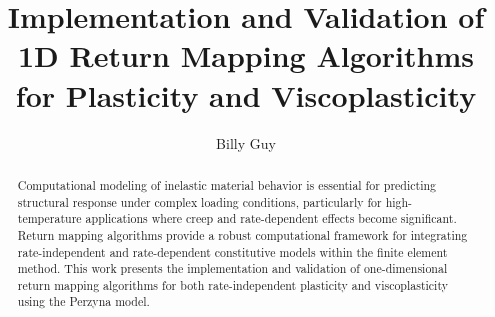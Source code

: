\documentclass[final,5p,times,twocolumn]{elsarticle}
\begin{document}
\begin{frontmatter}



\title{Implementation and Validation of 1D Return Mapping 
Algorithms for Plasticity and Viscoplasticity}


\author{Billy Guy} %


\begin{abstract}

Computational modeling of inelastic material behavior is essential for 
predicting structural response under complex loading conditions, particularly for high-temperature applications where creep and rate-dependent effects become significant. Return mapping algorithms provide a robust computational framework for integrating rate-independent and rate-dependent constitutive 
models within the finite element method. This work presents the implementation and validation of one-dimensional return mapping algorithms for both rate-independent plasticity and viscoplasticity using the Perzyna model.


\end{abstract}
\end{frontmatter}
\end{document}
